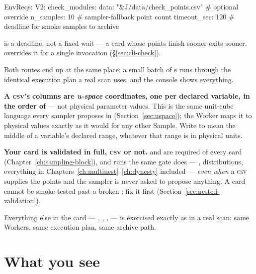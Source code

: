 \begin{yamlwin}
EnvReqs:
  V2:
    check_modules:
      data: "&J/data/check_points.csv"   # optional override
      n_samples: 10                      # sampler-fallback point count
      timeout_sec: 120                   # deadline for smoke samples to archive
\end{yamlwin}

 is a deadline, not a fixed wait --- a card whose points finish
sooner exits sooner.  overrides it for a single invocation
(\S\ref{sec:cli-check}).

Both routes end up at the same place: a small batch of s runs through the
identical execution plan a real scan uses, and the console shows everything.

\begin{jnote}
\textbf{A \textsc{csv}'s columns are \emph{u-space} coordinates, one per declared
variable, in the order of } --- not physical parameter
values. This is the same unit-cube language every sampler proposes in
(Section~\ref{sec:uspace}); the Worker maps it to physical values exactly as it would
for any other Sample. Write  to mean the middle of a variable's declared
range, whatever that range is in physical units.
\end{jnote}

\begin{jwarn}
\textbf{Your card is validated in full, \textsc{csv} or not.}
 and  are required of every card
(Chapter~\ref{ch:sampling-block}), and  runs the same gate  does ---
, distributions, everything in
Chapters~\ref{ch:multinest}--\ref{ch:dynesty} included --- \emph{even when} a
\textsc{csv} supplies the points and the sampler is never asked to propose anything. A
card cannot be smoke-tested past a broken ; fix it first
(Section~\ref{sec:nested-validation}).
\end{jwarn}

Everything else in the card --- , ,
,  --- is exercised exactly as in a real scan:
same Workers, same execution plan, same archive path.

\section{What you see}
\label{sec:check-output}

